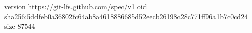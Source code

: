 version https://git-lfs.github.com/spec/v1
oid sha256:5ddfeb0a36802fc64ab8a4618886685d52eecb26198c28c771ff96a1b7c0cd24
size 87544

